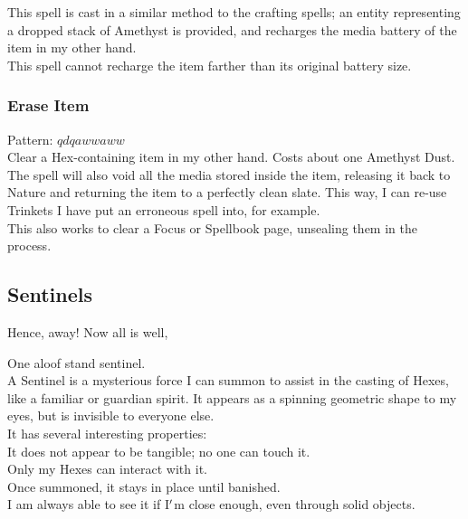 \documentclass[12pt]{article}
\begin{document}
  
    This spell is cast in a similar method to the crafting spells; an entity representing a dropped stack of Amethyst is provided, and recharges the media battery of the item in my other hand.\\This spell cannot recharge the item farther than its original battery size.\\


  \label{sec: patterns/spells/hexcasting@hexcasting:erase}
\subsubsection*{Erase Item}

    Pattern: $qdqawwaww$\\
      Clear a Hex-containing item in my other hand. Costs about one Amethyst Dust.\\


  
    The spell will also void all the media stored inside the item, releasing it back to Nature and returning the item to a perfectly clean slate. This way, I can re-use Trinkets I have put an erroneous spell into, for example.\\This also works to clear a Focus or Spellbook page, unsealing them in the process.\\

\newpage

\label{sec:patterns/spells/sentinels}
\subsection*{Sentinels}


  
    Hence, away! Now all is well,

One aloof stand sentinel.\\A Sentinel is a mysterious force I can summon to assist in the casting of Hexes, like a familiar or guardian spirit. It appears as a spinning geometric shape to my eyes, but is invisible to everyone else.\\


  
    It has several interesting properties:\\It does not appear to be tangible; no one can touch it.\\Only my Hexes can interact with it.\\Once summoned, it stays in place until banished.\\I am always able to see it if I$\rq$m close enough, even through solid objects.\\
\end{document}
